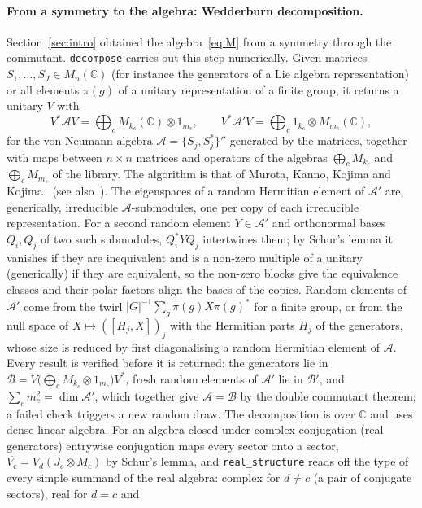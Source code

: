 \documentclass[11pt]{article}
\newcommand{\C}{\mathbb{C}}
\begin{document}
\paragraph{From a symmetry to the algebra: Wedderburn decomposition.} Section~\ref{sec:intro} obtained the
algebra~\eqref{eq:M} from a symmetry through the commutant. \texttt{decompose} carries out this step numerically.
Given matrices $S_1,\dots,S_J\in M_n(\C)$ (for instance the generators of a Lie algebra representation) or all elements
$\pi(g)$ of a unitary representation of a finite group, it returns a unitary $V$ with
\[
  V^*\mathcal AV=\bigoplus_cM_{k_c}(\C)\otimes1_{m_c},\qquad V^*\mathcal A'V=\bigoplus_c1_{k_c}\otimes M_{m_c}(\C),
\]
for the von Neumann algebra $\mathcal A=\{S_j,S_j^*\}''$ generated by the matrices, together with maps between
$n\times n$ matrices and operators of the algebras $\bigoplus_cM_{k_c}$ and $\bigoplus_cM_{m_c}$ of the library. The
algorithm is that of Murota, Kanno, Kojima and Kojima~\cite{murota2010} (see also~\cite{maehara2010}). The
eigenspaces of a random Hermitian element of $\mathcal A'$ are, generically, irreducible $\mathcal A$-submodules, one
per copy of each irreducible representation. For a second random element $Y\in\mathcal A'$ and orthonormal bases
$Q_i,Q_j$ of two such submodules, $Q_i^*YQ_j$ intertwines them; by Schur's lemma it vanishes if they are inequivalent
and is a non-zero multiple of a unitary (generically) if they are equivalent, so the non-zero blocks give the
equivalence classes and their polar factors align the bases of the copies. Random elements of $\mathcal A'$ come from
the twirl $|G|^{-1}\sum_g\pi(g)X\pi(g)^*$ for a finite group, or from the null space of $X\mapsto([H_j,X])_j$ with
the Hermitian parts $H_j$ of the generators, whose size is reduced by first diagonalising a random Hermitian element
of $\mathcal A$. Every result is verified before it is returned: the generators lie in
$\mathcal B=V\bigl(\bigoplus_cM_{k_c}\otimes1_{m_c}\bigr)V^*$, fresh random elements of $\mathcal A'$ lie in
$\mathcal B'$, and $\sum_cm_c^2=\dim\mathcal A'$, which together give $\mathcal A=\mathcal B$ by the double commutant
theorem; a failed check triggers a new random draw. The decomposition is over $\C$ and uses dense linear algebra. For
an algebra closed under complex conjugation (real generators) entrywise conjugation maps every sector onto a sector,
$\overline{V_c}=V_d(J_c\otimes M_c)$ by Schur's lemma, and \texttt{real\_structure} reads off the type of every simple
summand of the real algebra: complex for $d\neq c$ (a pair of conjugate sectors), real for $d=c$ and
\end{document}
